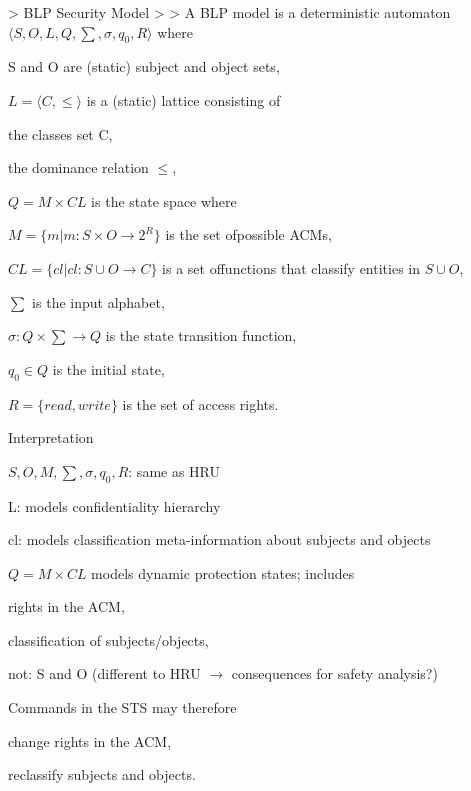 \documentclass[a4paper]{article}
\begin{document}
\begin{multicols}{3}
    > BLP Security Model
    >
    > A BLP model is a deterministic automaton $⟨S,O,L,Q,\sum,\sigma,q_0,R⟩$ where
    \begin{itemize*}
        \item S and O are (static) subject and object sets,
        \item $L=⟨C,\leq⟩$ is a (static) lattice consisting of
              \begin{itemize*}
                  \item the classes set C,
                  \item the dominance relation $\leq$,
              \end{itemize*}
        \item $Q=M\times CL$ is the state space where
              \begin{itemize*}
                  \item $M=\{m|m:S\times O\rightarrow 2^R\}$ is the set ofpossible ACMs,
                  \item $CL=\{cl|cl:S\cup O\rightarrow C\}$ is a set offunctions that classify entities in $S\cup O$,
              \end{itemize*}
        \item $\sum$ is the input alphabet,
        \item $\sigma:Q\times \sum\rightarrow Q$ is the state transition function,
        \item $q_0\in Q$ is the initial state,
        \item $R=\{read,write\}$ is the set of access rights.
    \end{itemize*}

    Interpretation
    \begin{itemize*}
        \item $S,O,M,\sum,\sigma,q_0,R$: same as HRU
        \item L: models confidentiality hierarchy
        \item cl: models classification meta-information about subjects and objects
        \item $Q=M\times CL$ models dynamic protection states; includes
              \begin{itemize*}
                  \item rights in the ACM,
                  \item classification of subjects/objects,
                  \item not: S and O (different to HRU $\rightarrow$ consequences for safety analysis?)
              \end{itemize*}
        \item Commands in the STS may therefore
              \begin{itemize*}
                  \item change rights in the ACM,
                  \item reclassify subjects and objects.
              \end{itemize*}
    \end{itemize*}


\end{multicols}
\end{document}
